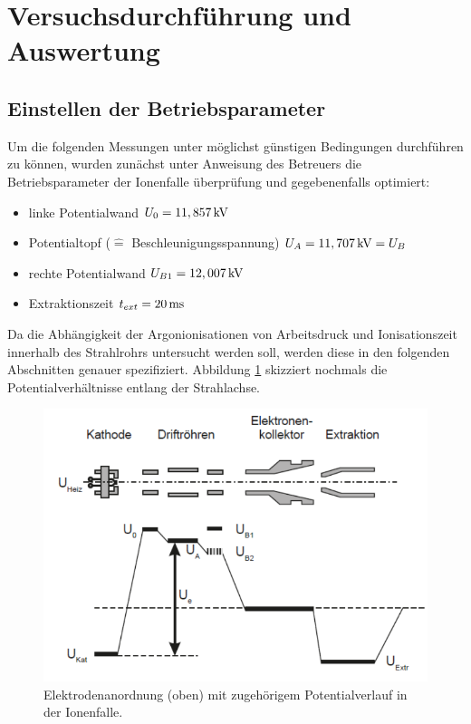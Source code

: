 \section{Versuchsdurchführung und Auswertung}
	\subsection{Einstellen der Betriebsparameter}
		Um die folgenden Messungen unter möglichst günstigen Bedingungen durchführen zu können, wurden zunächst unter Anweisung des Betreuers die Betriebsparameter der Ionenfalle überprüfung und gegebenenfalls optimiert:
		\begin{itemize}
			\item linke Potentialwand $U_0 = \unit[11,857]{kV}$
			\item Potentialtopf ($\hat{=}$ Beschleunigungsspannung) $U_A = \unit[11,707]{kV}=U_B$
			\item rechte Potentialwand $U_{B1} = \unit[12,007]{kV}$
			\item Extraktionszeit $t_{ext} = \unit[20]{ms}$
		\end{itemize}
		Da die Abhängigkeit der Argonionisationen von Arbeitsdruck und Ionisationszeit innerhalb des Strahlrohrs untersucht werden soll, werden diese in den folgenden Abschnitten genauer spezifiziert. Abbildung \ref{fig:potentialkasten} skizziert nochmals die Potentialverhältnisse entlang der Strahlachse.
		\begin{figure}
			\centering
			\includegraphics[width=0.8\linewidth]{pic/potentialkasten}
			\caption{Elektrodenanordnung (oben) mit zugehörigem Potentialverlauf in der Ionenfalle.\cite{PA}}
			\label{fig:potentialkasten}
		\end{figure}
		
